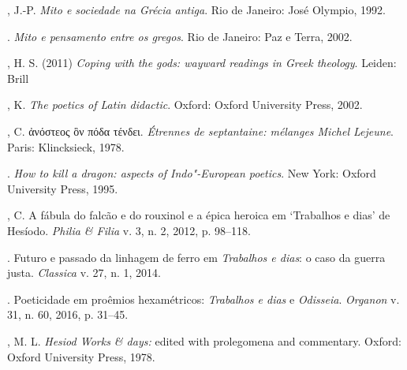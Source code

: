 \begin{bibliohedra}
, J.-P. \emph{Mito e sociedade na Grécia antiga}. Rio de Janeiro:
José Olympio, 1992.

\titidem. \emph{Mito e pensamento entre os gregos}. Rio de Janeiro: Paz e
Terra, 2002.

, H. S. (2011) \emph{Coping with the gods: wayward readings in
Greek theology}. Leiden: Brill

, K. \emph{The poetics of Latin didactic}. Oxford: Oxford University
Press, 2002.

, C. ἀνόστεος ὃν πόδα τένδει. \emph{Étrennes de septantaine:
mélanges Michel Lejeune}. Paris: Klincksieck, 1978.

\titidem. \emph{How to kill a dragon: aspects of Indo"-European poetics}. New
York: Oxford University Press, 1995.

, C. A fábula do falcão e do rouxinol e a épica heroica em
`Trabalhos e dias' de Hesíodo. \emph{Philia \& Filia} v. 3, n. 2, 2012,
p. 98--118.

\titidem. Futuro e passado da linhagem de ferro em \emph{Trabalhos e dias}: o
caso da guerra justa. \emph{Classica} v. 27, n. 1, 2014.

\titidem. Poeticidade em proêmios hexamétricos: \emph{Trabalhos e dias} e
\emph{Odisseia}. \emph{Organon} v. 31, n. 60, 2016, p. 31--45.

, M. L. \emph{Hesiod Works \& days:} edited with prolegomena and
commentary. Oxford: Oxford University Press, 1978.
\end{bibliohedra}

